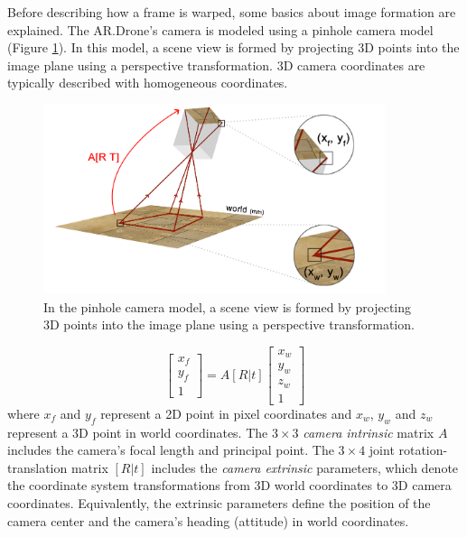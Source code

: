 Before describing how a frame is warped, some basics about image formation are explained. %
The AR.Drone's camera is modeled using a pinhole camera model (Figure \ref{fig:mapping1}).
In this model, a scene view is formed by projecting 3D points into the image plane using a perspective transformation.
3D camera coordinates are typically described with homogeneous coordinates.

\begin{figure}[htb]
\centering
\includegraphics[width=10cm]{images/mapping0.png}
\caption{In the pinhole camera model, a scene view is formed by projecting 3D points into the image plane using a perspective transformation.}
\label{fig:mapping1}
\end{figure}

\begin{equation}
\left[ {
\begin{array}{c} x_f \\ y_f \\ 1 \end{array}
} \right]
= A[R|t]
\left[ {
\begin{array}{c} x_w \\ y_w \\ z_w \\ 1 \end{array}
} \right]
\end{equation}
where $x_f$ and $y_f$ represent a 2D point in pixel coordinates and $x_w$, $y_w$ and $z_w$ represent a 3D point in world coordinates.
The $3 \times 3$ \textit{camera intrinsic} matrix $A$ includes the camera's focal length and principal point.
The $3 \times 4$ joint rotation-translation matrix $[R|t]$ includes the \textit{camera extrinsic} parameters, which denote the coordinate system transformations from 3D world coordinates to 3D camera coordinates. Equivalently, the extrinsic parameters define the position of the camera center and the camera's heading (attitude) in world coordinates.

